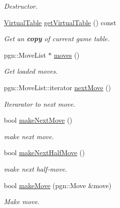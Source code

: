 \begin{DoxyCompactItemize}
\begin{DoxyCompactList}\small\item\em Destructor. \item\end{DoxyCompactList}\item 
\hyperlink{classChEngn_1_1Table}{VirtualTable} \hyperlink{classChEngn_1_1Engine_a26f8db48e99d547fbc41eaa9dca8e6cf}{getVirtualTable} () const 
\begin{DoxyCompactList}\small\item\em Get an {\bfseries copy} of current game table. \item\end{DoxyCompactList}\item 
pgn::MoveList $\ast$ \hyperlink{classChEngn_1_1Engine_aad1f51b4eed22bb6eab999ffb7fa2516}{moves} ()
\begin{DoxyCompactList}\small\item\em Get loaded moves. \item\end{DoxyCompactList}\item 
pgn::MoveList::iterator \hyperlink{classChEngn_1_1Engine_ad35252a7c6a7e84a34d12a688360a75f}{nextMove} ()
\begin{DoxyCompactList}\small\item\em Iterarator to next move. \item\end{DoxyCompactList}\item 
bool \hyperlink{classChEngn_1_1Engine_a16b3f2bb7787bccf321f8a03935947c2}{makeNextMove} ()
\begin{DoxyCompactList}\small\item\em make next move. \item\end{DoxyCompactList}\item 
bool \hyperlink{classChEngn_1_1Engine_ab9f6f3cbf3e7866887b049f61f9ce46b}{makeNextHalfMove} ()
\begin{DoxyCompactList}\small\item\em make next half-\/move. \item\end{DoxyCompactList}\item 
bool \hyperlink{classChEngn_1_1Engine_a3bfc7cfe7e147e4d5d7f645d0cb72c8d}{makeMove} (pgn::Move \&move)
\begin{DoxyCompactList}\small\item\em Make move. \item\end{DoxyCompactList}\item 

\end{DoxyCompactItemize}
